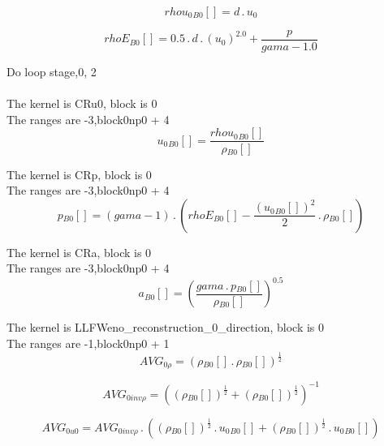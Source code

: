 \documentclass{article}
\begin{document}
\begin{dmath}{rhou_{0}{_{B0}}}[{}] = d \,.\, u_{0}\end{dmath}

\begin{dmath}{rhoE{_{B0}}}[{}] = 0.5 \,.\, d \,.\, \left(u_{0} \right)^{2.0} + \frac{p}{gama - 1.0}\end{dmath}

\noindent Do loop stage,0, 2\\
\\\noindent The kernel is CRu0, block is 0\\\noindent The ranges are -3,block0np0 + 4\\\begin{dmath}{u_{0}{_{B0}}}[{}] = \frac{{rhou_{0}{_{B0}}}[{}]}{{\rho{_{B0}}}[{}]}\end{dmath}

\noindent The kernel is CRp, block is 0\\\noindent The ranges are -3,block0np0 + 4\\\begin{dmath}{p{_{B0}}}[{}] = \left(gama - 1\right) \,.\, \left({rhoE{_{B0}}}[{}] - \frac{\left({u_{0}{_{B0}}}[{}] \right)^{2}}{2} \,.\, {\rho{_{B0}}}[{}]\right)\end{dmath}

\noindent The kernel is CRa, block is 0\\\noindent The ranges are -3,block0np0 + 4\\\begin{dmath}{a{_{B0}}}[{}] = \left(\frac{gama \,.\, {p{_{B0}}}[{}]}{{\rho{_{B0}}}[{}]} \right)^{0.5}\end{dmath}

\noindent The kernel is LLFWeno_reconstruction_0_direction, block is 0\\\noindent The ranges are -1,block0np0 + 1\\\begin{dmath}AVG_{0 \rho} = \left({\rho{_{B0}}}[{}] \,.\, {\rho{_{B0}}}[{}] \right)^{\frac{1}{2}}\end{dmath}

\begin{dmath}AVG_{0 inv \rho} = \left(\left({\rho{_{B0}}}[{}] \right)^{\frac{1}{2}} + \left({\rho{_{B0}}}[{}] \right)^{\frac{1}{2}} \right)^{-1}\end{dmath}

\begin{dmath}AVG_{0 u0} = AVG_{0 inv \rho} \,.\, \left(\left({\rho{_{B0}}}[{}] \right)^{\frac{1}{2}} \,.\, {u_{0}{_{B0}}}[{}] + \left({\rho{_{B0}}}[{}] \right)^{\frac{1}{2}} \,.\, {u_{0}{_{B0}}}[{}]\right)\end{dmath}
\end{document}
